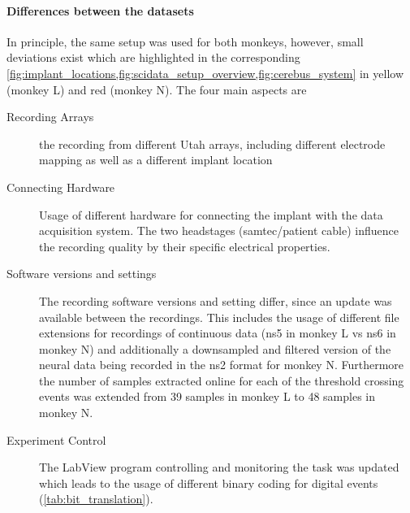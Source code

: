 \paragraph{Differences between the datasets}
In principle, the same setup was used for both monkeys, however, small deviations exist which are highlighted in the corresponding \cref{fig:implant_locations,fig:scidata_setup_overview,fig:cerebus_system} in yellow (monkey L) and red (monkey N). The four main aspects are
\begin{description}
 \item[Recording Arrays] the recording from different Utah arrays, including different electrode mapping as well as a different implant location
 \item[Connecting Hardware] Usage of different hardware for connecting the implant with the data acquisition system. The two headstages (samtec/patient cable) influence the recording quality by their specific electrical properties.
 \item[Software versions and settings] The recording software versions and setting differ, since an update was available between the recordings. This includes the usage of different file extensions for recordings of continuous data (ns5 in monkey L vs ns6 in monkey N) and additionally a downsampled and filtered version of the neural data being recorded in the ns2 format for monkey N. Furthermore the number of samples extracted online for each of the threshold crossing events was extended from 39 samples in monkey L to 48 samples in monkey N.
 \item[Experiment Control] The LabView program controlling and monitoring the task was updated which leads to the usage of different binary coding for digital events (\cref{tab:bit_translation}). 
\end{description}




